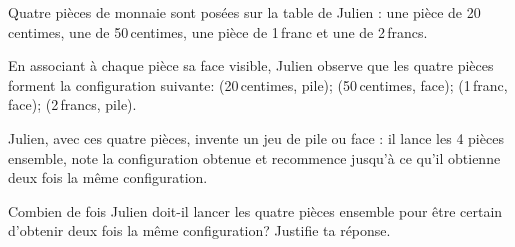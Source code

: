 

\vspace{10pt}
Quatre pièces de monnaie sont posées sur la table de Julien : une pièce de 20\,centimes, une de 50\,centimes, une pièce de 1\,franc et une de 2\,francs.

En associant à chaque pièce sa face visible, Julien observe que les quatre pièces forment la configuration suivante: (20\,centimes, pile); (50\,centimes, face); (1\,franc, face); (2\,francs, pile).

Julien, avec ces quatre pièces, invente un jeu de \og pile ou face \fg{}: il lance les 4 pièces ensemble, note la configuration obtenue et recommence jusqu'à ce qu'il obtienne deux fois la même configuration.

Combien de fois Julien doit-il lancer les quatre pièces ensemble pour être certain d'obtenir deux fois la même configuration? Justifie ta réponse.

